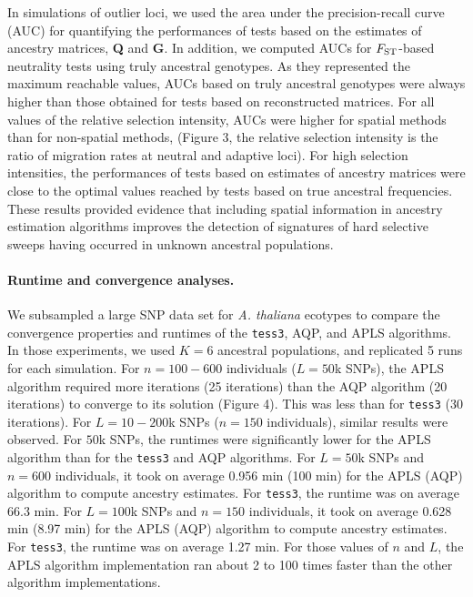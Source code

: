 In simulations of outlier loci, we used the area under the precision-recall curve (AUC) for quantifying the performances of tests based on the estimates of ancestry matrices, {\bf Q} and {\bf G}. In addition, we computed AUCs for $F_{\rm ST}$-based neutrality tests using truly ancestral genotypes. As they represented the maximum reachable values, AUCs based on truly ancestral genotypes were always higher than those obtained for tests based on reconstructed matrices. For all values of the relative  selection intensity, AUCs were higher for spatial methods than for non-spatial methods, (Figure 3, the relative selection intensity is the ratio of migration rates at neutral and adaptive loci). For high selection intensities, the performances of tests based on estimates of ancestry matrices were close to the optimal values reached  by tests based on true ancestral frequencies. These results provided evidence that including spatial information in ancestry estimation algorithms improves the detection of signatures of hard selective sweeps having occurred in unknown ancestral populations. 

\paragraph{Runtime and convergence analyses.} We subsampled a large SNP data set for {\it A. thaliana} ecotypes  to compare the convergence properties and runtimes of the {\tt tess3}, AQP, and APLS algorithms. In those experiments, we used $K = 6$ ancestral populations, and replicated 5 runs for each simulation. For $n = 100-600$ individuals ($L = 50$k SNPs), the APLS algorithm required more iterations (25 iterations)  than the AQP algorithm (20 iterations) to converge to its solution  (Figure 4). This was less than for {\tt tess3} (30 iterations).  For $L = 10-200$k SNPs ($n = 150$ individuals), similar results were observed. For $50$k SNPs, the runtimes were significantly lower for the APLS algorithm than for the {\tt tess3} and AQP algorithms. For $L = 50$k SNPs and $n = 600$ individuals, it took on average 0.956 min (100 min) for the APLS (AQP) algorithm to compute ancestry estimates. For {\tt tess3}, the runtime was on average 66.3 min. For $L = 100$k SNPs and $n = 150$ individuals, it took on average 0.628 min (8.97 min) for the APLS (AQP) algorithm to compute ancestry estimates. For {\tt tess3}, the runtime was on average 1.27 min.  For those values of $n$ and $L$, the APLS algorithm implementation ran about 2 to 100 times faster than the other algorithm implementations.
 
